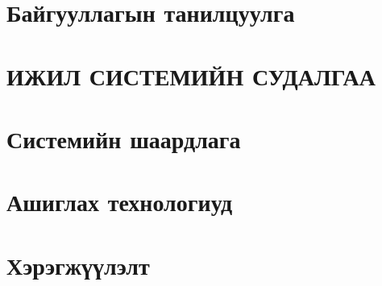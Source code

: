 \chapter{Байгууллагын танилцуулга}

\chapter{ИЖИЛ СИСТЕМИЙН СУДАЛГАА}

\chapter{Системийн шаардлага}

\chapter{Ашиглах технологиуд}

\chapter{Хэрэгжүүлэлт}


